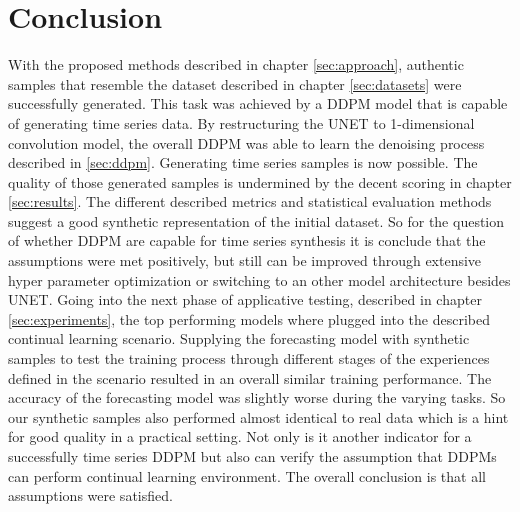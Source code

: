 \chapter{Conclusion}
\label{sec:conclusion}
With the proposed methods described in chapter \ref{sec:approach}, authentic samples that resemble the dataset described in chapter \ref{sec:datasets} were successfully generated.
This task was achieved by a DDPM model that is capable of generating time series data. 
By restructuring the UNET to 1-dimensional convolution model, the overall DDPM was able to learn the denoising process described in \ref{sec:ddpm}. Generating time series samples is now possible.
The quality of those generated samples is undermined by the decent scoring in chapter \ref{sec:results}. 
The different described metrics and statistical evaluation methods suggest a good synthetic representation of the initial dataset. 
So for the question of whether DDPM are capable for time series synthesis it is conclude that the assumptions were met positively, but still can be improved through extensive hyper parameter optimization or switching to an other model architecture besides UNET.
Going into the next phase of applicative testing, described in chapter \ref{sec:experiments}, the top performing models where plugged into the described continual learning scenario.
Supplying the forecasting model with synthetic samples to test the training process through different stages of the experiences defined in the 
scenario resulted in an overall similar training performance. The accuracy of the forecasting model was slightly worse during the varying tasks. So our synthetic samples also performed almost identical to real data which is a hint for good quality in a practical setting. Not only is it another indicator for a successfully time series DDPM but also 
can verify the assumption that DDPMs can perform continual learning environment. The overall conclusion is that all assumptions were satisfied.
